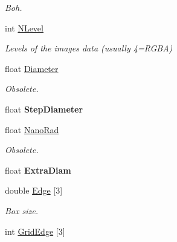 \begin{DoxyCompactItemize}
\begin{DoxyCompactList}\small\item\em \-Boh. \end{DoxyCompactList}\item 
\hypertarget{classDraw_a19d9a879122b0ab65c5e8e3731bd9467}{int \hyperlink{classDraw_a19d9a879122b0ab65c5e8e3731bd9467}{\-N\-Level}}\label{classDraw_a19d9a879122b0ab65c5e8e3731bd9467}

\begin{DoxyCompactList}\small\item\em \-Levels of the images data (usually 4=\-R\-G\-B\-A) \end{DoxyCompactList}\item 
\hypertarget{classDraw_a90c9c7c0eafa124c8fd3b3a3d95db7d4}{float \hyperlink{classDraw_a90c9c7c0eafa124c8fd3b3a3d95db7d4}{\-Diameter}}\label{classDraw_a90c9c7c0eafa124c8fd3b3a3d95db7d4}

\begin{DoxyCompactList}\small\item\em \-Obsolete. \end{DoxyCompactList}\item 
\hypertarget{classDraw_a63674d570288f4010522a408a7436963}{float {\bfseries \-Step\-Diameter}}\label{classDraw_a63674d570288f4010522a408a7436963}

\item 
\hypertarget{classDraw_a484f4fe71f04b01951ab3b73faf660ac}{float \hyperlink{classDraw_a484f4fe71f04b01951ab3b73faf660ac}{\-Nano\-Rad}}\label{classDraw_a484f4fe71f04b01951ab3b73faf660ac}

\begin{DoxyCompactList}\small\item\em \-Obsolete. \end{DoxyCompactList}\item 
\hypertarget{classDraw_aa01b91996d51849456c091594624f240}{float {\bfseries \-Extra\-Diam}}\label{classDraw_aa01b91996d51849456c091594624f240}

\item 
\hypertarget{classDraw_a8895c89605e91c6cf7430bad336f77c6}{double \hyperlink{classDraw_a8895c89605e91c6cf7430bad336f77c6}{\-Edge} \mbox{[}3\mbox{]}}\label{classDraw_a8895c89605e91c6cf7430bad336f77c6}

\begin{DoxyCompactList}\small\item\em \-Box size. \end{DoxyCompactList}\item 
\hypertarget{classDraw_a0a12d9a9a2d537e1eec0bceb7eb9c604}{int \hyperlink{classDraw_a0a12d9a9a2d537e1eec0bceb7eb9c604}{\-Grid\-Edge} \mbox{[}3\mbox{]}}\label{classDraw_a0a12d9a9a2d537e1eec0bceb7eb9c604}


\end{DoxyCompactItemize}
